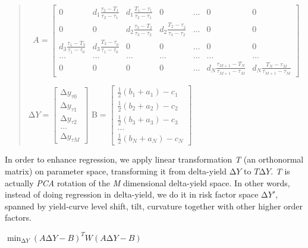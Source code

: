 \begin{quote}
\[A = \begin{bmatrix}
0 & d_{1}\frac{\tau_{2} - T_{1}}{\tau_{2} - \tau_{1}} & d_{1}\frac{T_{1} - \tau_{1}}{\tau_{2} - \tau_{1}} & 0 & \ldots & 0 & 0 \\
0 & 0 & d_{2}\frac{\tau_{3} - T_{2}}{\tau_{3} - \tau_{2}} & d_{2}\frac{{T_{2} - \tau}_{2}}{\tau_{3} - \tau_{2}} & \ldots & 0 & 0 \\
d_{3}\frac{\tau_{1} - T_{3}}{\tau_{1} - \tau_{0}} & d_{3}\frac{{T_{3} - \tau}_{0}}{\tau_{1} - \tau_{0}} & 0 & 0 & \ldots & 0 & 0 \\
\ldots & \ldots & \ldots & \ldots & \ldots & \ldots & \ldots \\
0 & 0 & 0 & 0 & \ldots & d_{N}\frac{\tau_{M + 1} - T_{N}}{\tau_{M + 1} - \tau_{M}} & d_{N}\frac{T_{N} - \tau_{M}}{\tau_{M + 1} - \tau_{M}}
\end{bmatrix}\]

\(\mathrm{\Delta}Y = \begin{bmatrix}
{\mathrm{\Delta}y}_{\tau 0} \\
{\mathrm{\Delta}y}_{\tau 1} \\
\mathrm{\Delta}y_{\tau 2} \\
\ldots \\
{\mathrm{\Delta}y}_{\tau M}
\end{bmatrix}\) B\(= \begin{bmatrix}
\frac{1}{2}\left( b_{1} + a_{1} \right) - c_{1} \\
\frac{1}{2}\left( b_{2} + a_{2} \right) - c_{2} \\
\frac{1}{2}\left( b_{3} + a_{3} \right) - c_{3} \\
\ldots \\
\frac{1}{2}\left( b_{N} + a_{N} \right) - c_{N}
\end{bmatrix}\)
\end{quote}

In order to enhance regression, we apply linear transformation \emph{T}
(an orthonormal matrix) on parameter space, transforming it from
delta-yield \(\mathrm{\Delta}Y\) to \(T\mathrm{\Delta}Y\). \emph{T} is
actually \emph{PCA} rotation of the \emph{M} dimensional delta-yield
space. In other words, instead of doing regression in delta-yield, we do
it in risk factor space \(\mathrm{\Delta}Y'\), spanned by yield-curve
level shift, tilt, curvature together with other higher order factors.

\(\min_{\mathrm{\Delta}Y}(A\mathrm{\Delta}Y - B)^{T}W(A\mathrm{\Delta}Y - B)\)


